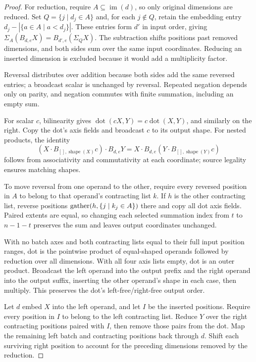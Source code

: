 \begin{proof}
For reduction, require $A\subseteq\operatorname{im}(d)$, so only original
dimensions are reduced. Set $Q=\{j\mid d_j\in A\}$ and, for
each $j\notin Q$, retain the embedding entry
$d_j-|\{a\in A\mid a<d_j\}|$. These entries form $d'$ in input order,
giving $\Sigma_A(B_{d,e}X)=B_{d',e}(\Sigma_QX)$.
The subtraction shifts positions past removed dimensions, and both sides
sum over the same input coordinates. Reducing an inserted dimension is
excluded because it would add a multiplicity factor.

Reversal distributes over addition because both sides add the same
reversed entries; a broadcast scalar is unchanged by reversal.
Repeated negation depends only on parity, and negation commutes with
finite summation, including an empty sum.

For scalar $c$, bilinearity gives
$\operatorname{dot}(cX,Y)=c\operatorname{dot}(X,Y)$, and similarly on the
right. Copy the dot's axis fields and broadcast $c$ to its output shape.
For nested products, the identity
\[
 (X\cdot B_{[],\operatorname{shape}(X)}c)\cdot B_{d,e}Y
 =X\cdot B_{d,e}(Y\cdot B_{[],\operatorname{shape}(Y)}c)
\]
follows from associativity and commutativity at each coordinate;
source legality ensures matching shapes.

To move reversal from one operand to the other, require every reversed
position in $A$ to belong to that operand's contracting list $k$.
If $h$ is the other contracting list, reverse positions
$\operatorname{gather}(h,\{j\mid k_j\in A\})$ there and copy all dot axis fields.
Paired extents are equal, so changing each selected summation index
from $t$ to $n-1-t$ preserves the sum and leaves output coordinates unchanged.

With no batch axes and both contracting lists equal to their full input
position ranges, dot is the pointwise product of equal-shaped operands
followed by reduction over all dimensions.
With all four axis lists empty, dot is an outer product.
Broadcast the left operand into the output prefix and the right operand
into the output suffix, inserting the other operand's shape in each case,
then multiply. This preserves the dot's left-free/right-free output order.

Let $d$ embed $X$ into the left operand, and let $I$ be the inserted
positions. Require every position in $I$ to belong to the left contracting
list. Reduce $Y$ over the right contracting positions paired with $I$,
then remove those pairs from the dot. Map the remaining left batch and
contracting positions back through $d$. Shift each surviving right position
to account for the preceding dimensions removed by the reduction.


\end{proof}
